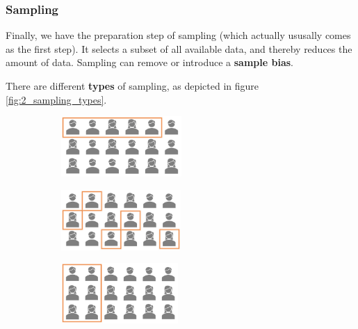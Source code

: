 \subsubsection*{Sampling}
Finally, we have the preparation step of sampling (which actually ususally comes as the first step). It selects a subset of all available data, and thereby reduces the amount of data. Sampling can remove or introduce a \textbf{sample bias}. 

There are different \textbf{types} of sampling, as depicted in figure \ref{fig:2_sampling_types}.

\begin{figure}[h]
  \centering

  \begin{subfigure}{0.4\textwidth}
    \centering
    \includegraphics[height=2.3cm]{assets/visualization_and_extraction/prep/sample_top.png}
  \end{subfigure}
  \begin{subfigure}{0.4\textwidth}
    \centering
    \includegraphics[height=2.3cm]{assets/visualization_and_extraction/prep/sample_random.png}
  \end{subfigure}

  \vspace*{0.2cm}
  \begin{subfigure}{0.4\textwidth}
    \centering
    \includegraphics[height=2.3cm]{assets/visualization_and_extraction/prep/sample_stratified.png}
  \end{subfigure}


\end{figure}

